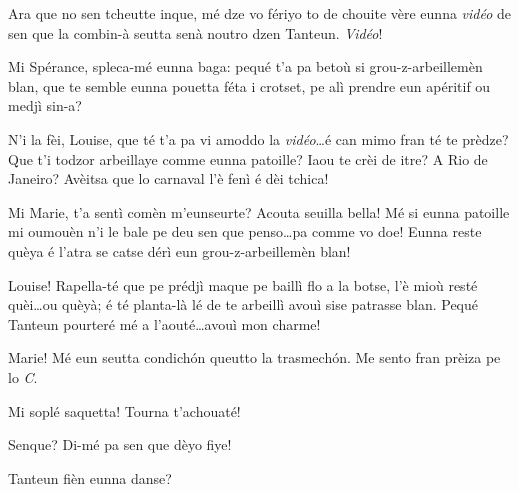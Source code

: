 \begin{drama}


\Mariespeaks Ara que no sen tcheutte inque, mé dze vo fériyo to de chouite vère eunna \textit{vidéo} de sen que la combin-à seutta senà noutro dzen Tanteun. \textit{Vidéo}!



\Louisespeaks Mi Spérance, spleca-mé eunna baga: pequé t'a pa betoù si grou-z-arbeillemèn blan, que te semble eunna pouetta féta i crotset, pe alì prendre eun apéritif ou medjì sin-a?

\Sperancespeaks  N'i la fèi, Louise, que té t'a pa vi amoddo la \textit{vidéo}\ldots é can mimo fran té te prèdze? Que t'i todzor arbeillaye comme eunna patoille? Iaou te crèi de itre? A Rio de Janeiro? Avèitsa que lo carnaval l'è fenì é dèi tchica!

\Louisespeaks Mi Marie, t’a sentì comèn m’eunseurte? Acouta seuilla bella! Mé si eunna patoille mi oumouèn n'i le bale pe deu sen que penso\ldots pa comme vo doe! Eunna reste quèya é l'atra se catse dérì eun grou-z-arbeillemèn blan!

\Alicespeaks  Louise! Rapella-té que pe prédjì maque pe baillì flo a la botse, l’è mioù resté quèi\ldots ou quèyà;  é té planta-là lé de te arbeillì avouì sise patrasse blan. Pequé Tanteun pourteré mé a l’aouté\ldots avouì mon charme!


\Sperancespeaks Marie! Mé eun seutta condich\'on queutto la trasmech\'on. Me sento fran prèiza pe lo \textit{C}.


\Alicespeaks Mi soplé saquetta! Tourna t'achouaté!

\Sperancespeaks Senque? Di-mé pa sen que dèyo fiye!


\Louisespeaks{} Tanteun fièn eunna danse?



\end{drama}
